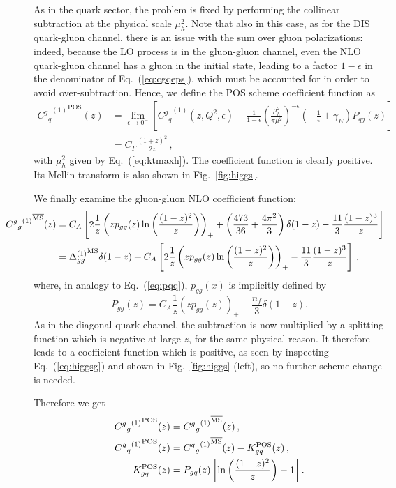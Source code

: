 As in the quark sector, the problem is fixed by performing the
collinear subtraction at the physical scale $\mu_h^2$. Note that
also in this case, as for the DIS quark-gluon channel,
there is an issue with the sum over gluon polarizations: indeed,
because the LO process is in the gluon-gluon channel, even the NLO
quark-gluon channel has a gluon in the initial state, leading
to a factor  $1-\epsilon$ in the 
denominator of Eq.~(\ref{eq:cgqeps}), which must be accounted for in
order to avoid over-subtraction.
Hence, we define the POS scheme coefficient function as
\begin{align}\label{eq:cqrenposh}
  {{C^g{}_q}^{(1)}}^{\textrm{POS}} (z)  &= \lim_{\epsilon\to0^-}
  \left[  {C^g{}_q}^{(1)}(z,Q^2,\epsilon) - \frac{1}{1-\epsilon}\left(\frac{\mu_h^2}{\pi\mu^2}\right)^{-\epsilon} \left(-\frac 1
    {\epsilon}+\gamma_E\right) P_{qg}(z)\right]\\ \label{eq:cqrenposh1}
    &=C_F \frac{(1+z)^2}{2z} \, ,
\end{align}
with $\mu_h^2$ given by Eq.~(\ref{eq:ktmaxh}).
The coefficient function is clearly positive. Its Mellin transform is
also shown in Fig.~\ref{fig:higgs}.

We finally examine the gluon-gluon NLO coefficient function:
\begin{align}\label{eq:higgsg}
\hspace*{-30pt}  {{C^g{}_g}^{(1)}}^{\mmsbar} (z) &=C_A\left[ 2\frac 1 z \left(z p_{gg}(z) \ln\left(\frac{(1-z)^2}{z}\right) \right)_++
    \left(\frac{473}{36} + \frac{4\pi^2}{3}\right)\delta(1-z) -
    \frac{11}{3}\frac{(1-z)^3}{z}\right]\nonumber\\
&={\Delta^{(1)}_{gg}}^{\mmsbar}\delta(1-z)+ C_A\left[ 2\frac 1 z \left(z p_{gg}(z) \ln\left(\frac{(1-z)^2}{z}\right) \right)_+-
    \frac{11}{3}\frac{(1-z)^3}{z}\right] \,,
\end{align}
where, in analogy to Eq.~(\ref{eq:pqq}), $p_{gg}(x)$ is implicitly
defined by
\begin{equation}\label{eq:pgg}
  P_{gg}(z)= C_A\frac 1 z \left(z p_{gg}(z)\right)_+ - \frac{n_f}{3} \delta(1-z).
\end{equation}
As in the diagonal quark channel, the \msbar{} subtraction is now
multiplied by a splitting function which is negative at large $z$, for
the same physical reason. It therefore leads to a coefficient function
which is positive, as seen by inspecting Eq.~(\ref{eq:higgsg}) and
shown in Fig.~\ref{fig:higgs} (left), so no further scheme change is needed.

Therefore we get
\begin{align}\label{eq:counthgg}
 {{C^g{}_g}^{(1)}}^{\textrm{POS}}(z) &=  {{C^g{}_g}^{(1)}}^{{\overline{\textrm{{MS}}}}}(z) \,, \\
 {{C^g{}_q}^{(1)}}^{\textrm{POS}}(z) &=  {{C^q{}_g}^{(1)}}^{{\overline{\textrm{{MS}}}}}(z) - K_{gq}^{\textrm{POS}} (z) \,,\\ \label{eq:counthgq}
  K_{gq}^{\textrm{POS}} (z) &=  P_{gq}(z)\left[\ln\left(\frac{(1-z)^2}{z}\right)
    - 1\right].
\end{align}

